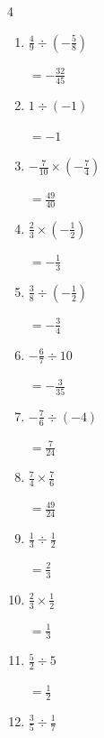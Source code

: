 \begin{multicols}{4}
\begin{enumerate}
        $\displaystyle =\frac{7}{10}$

\columnbreak %

  \item $\displaystyle \frac{4}{9}\div{}\left(-\frac{5}{8}\right)$

        $\displaystyle =-\frac{32}{45}$

  \item $\displaystyle 1\div{}\left(-1\right)$

        $\displaystyle =-1$

  \item $\displaystyle -\frac{7}{10}\times{}\left(-\frac{7}{4}\right)$

        $\displaystyle =\frac{49}{40}$

  \item $\displaystyle \frac{2}{3}\times{}\left(-\frac{1}{2}\right)$

        $\displaystyle =-\frac{1}{3}$

  \item $\displaystyle \frac{3}{8}\div{}\left(-\frac{1}{2}\right)$

        $\displaystyle =-\frac{3}{4}$

  \item $\displaystyle -\frac{6}{7}\div{}10$

        $\displaystyle =-\frac{3}{35}$

  \item $\displaystyle -\frac{7}{6}\div{}\left(-4\right)$

        $\displaystyle =\frac{7}{24}$

  \item $\displaystyle \frac{7}{4}\times{}\frac{7}{6}$

        $\displaystyle =\frac{49}{24}$

  \item $\displaystyle \frac{1}{3}\div{}\frac{1}{2}$

        $\displaystyle =\frac{2}{3}$

  \item $\displaystyle \frac{2}{3}\times{}\frac{1}{2}$

        $\displaystyle =\frac{1}{3}$

\columnbreak %

  \item $\displaystyle \frac{5}{2}\div{}5$

        $\displaystyle =\frac{1}{2}$

  \item $\displaystyle \frac{3}{5}\div{}\frac{1}{7}$


\end{enumerate}
\end{multicols}
